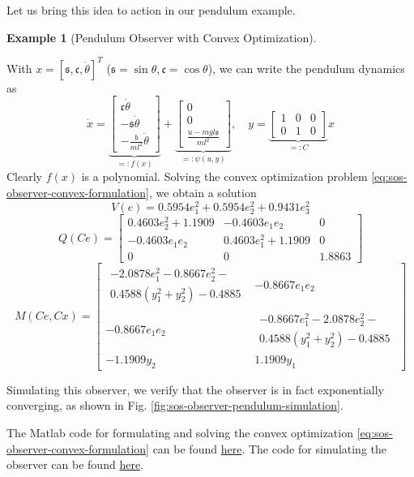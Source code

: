 \documentclass[
]{book}
\theoremstyle{definition}
\theoremstyle{definition}
\newtheorem{example}{Example}[chapter]
\theoremstyle{definition}
\theoremstyle{definition}
\theoremstyle{remark}
\begin{document}
Let us bring this idea to action in our pendulum example.

\begin{example}[Pendulum Observer with Convex Optimization]
\protect\hypertarget{exm:pendulumobserverconvex}{}\label{exm:pendulumobserverconvex}

With \(x = [\mathfrak{s}, \mathfrak{c}, \dot{\theta}]^T\) (\(\mathfrak{s} = \sin \theta, \mathfrak{c} = \cos \theta\)), we can write the pendulum dynamics as
\[
\dot{x} = \underbrace{\begin{bmatrix} 
\mathfrak{c} \dot{\theta} \\
- \mathfrak{s} \dot{\theta} \\
- \frac{b}{ml^2} \dot{\theta} 
\end{bmatrix}}_{=:f(x)} + \underbrace{\begin{bmatrix} 
0 \\ 0 \\ \frac{u - mgl \mathfrak{s}}{ml^2} \end{bmatrix}}_{=: \psi(u,y)}, \quad y = 
\underbrace{\begin{bmatrix} 
1 & 0 & 0 \\ 
0 & 1 & 0 \end{bmatrix}}_{=:C} x
\]
Clearly \(f(x)\) is a polynomial. Solving the convex optimization problem \eqref{eq:sos-observer-convex-formulation}, we obtain a solution
\[
V(e) = 0.5954 e_1^2 + 0.5954 e_2^2 + 0.9431 e_3^2
\]
\[
Q(Ce) = \begin{bmatrix}
0.4603 e_2^2 + 1.1909 & -0.4603 e_1 e_2 & 0 \\
-0.4603 e_1 e_2 & 0.4603 e_1^2 + 1.1909 & 0 \\
0 & 0 & 1.8863 \end{bmatrix}
\]
\[
M(Ce,Cx) = \begin{bmatrix}
\substack{-2.0878 e_1^2 - 0.8667 e_2^2 - \\ 0.4588 (y_1^2 + y_2^2) - 0.4885} & - 0.8667 e_1 e_2 \\
- 0.8667 e_1 e_2 & \substack{-0.8667 e_1^2 - 2.0878 e_2^2 - \\ 0.4588 (y_1^2 + y_2^2) - 0.4885} \\
-1.1909 y_2 & 1.1909 y_1
\end{bmatrix}
\]

Simulating this observer, we verify that the observer is in fact exponentially converging, as shown in Fig. \ref{fig:sos-observer-pendulum-simulation}.

The Matlab code for formulating and solving the convex optimization \eqref{eq:sos-observer-convex-formulation} can be found \href{https://github.com/ComputationalRobotics/OptimalControlEstimation-Examples/blob/main/pendulum_sos_observer.m}{here}. The code for simulating the observer can be found \href{https://github.com/ComputationalRobotics/OptimalControlEstimation-Examples/blob/main/pendulum_sos_observer_simulation.m}{here}.


\end{example}
\end{document}
